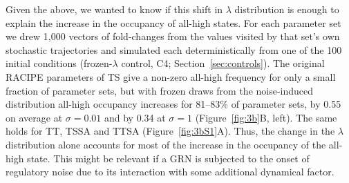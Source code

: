 \documentclass[11pt]{article}
\providecommand{\DIFaddtex}[1]{{\protect\color{red}#1}} %
\providecommand{\DIFdeltex}[1]{} %
\providecommand{\DIFaddbegin}{} %
\providecommand{\DIFaddend}{} %
\providecommand{\DIFdelbegin}{} %
\providecommand{\DIFdelend}{} %
\providecommand{\DIFadd}[1]{\texorpdfstring{\DIFaddtex{#1}}{#1}} %
\providecommand{\DIFdel}[1]{\texorpdfstring{\DIFdeltex{#1}}{}} %
\providecommand{\DIFaddincludegraphics}[2][]{\DIFOincludegraphics[#1]{#2}} %
\providecommand{\DIFdelincludegraphics}[2][]{}
\DeclareRobustCommand{\DIFaddbegin}{\DIFOaddbegin \let\includegraphics\DIFaddincludegraphics} %
\DeclareRobustCommand{\DIFaddend}{\DIFOaddend \let\includegraphics\DIFOincludegraphics} %
\DeclareRobustCommand{\DIFdelbegin}{\DIFOdelbegin \let\includegraphics\DIFdelincludegraphics} %
\DeclareRobustCommand{\DIFdelend}{\DIFOaddend \let\includegraphics\DIFOincludegraphics} %
\begin{document}
Given the above, we wanted to know if this shift in $\lambda$ distribution is enough to \DIFdelbegin \DIFdel{completely }\DIFdelend explain the increase in the \DIFdelbegin \DIFdel{MRT }\DIFdelend \DIFaddbegin \DIFadd{occupancy }\DIFaddend of all-high states. For each parameter set \DIFdelbegin \DIFdel{used for stochastic simulations, we sampled $\lambda$ from the additive noise stationary distribution shown in (Figure~\ref{fig:3b}A). For each such $\lambda$ combination, we simulated the networks deterministically }\DIFdelend \DIFaddbegin \DIFadd{we drew 1}{\DIFadd{,}}\DIFadd{000 vectors of fold-changes from the values visited by that set's own stochastic trajectories and simulated each deterministically from one of the 100 initial conditions }\DIFaddend (\DIFdelbegin \DIFdel{$\sigma = 0$) at multiple randomly sampled initial conditions and calculate the mean frequency of each discrete state across initial conditions , which is further averaged over different }\DIFdelend \DIFaddbegin \DIFadd{frozen-}\DIFaddend $\lambda$ \DIFdelbegin \DIFdel{values. While the }\DIFdelend \DIFaddbegin \DIFadd{control, C4; Section~\ref{sec:controls}). The }\DIFaddend original RACIPE parameters \DIFdelbegin \DIFdel{for TS and TT have a very }\DIFdelend \DIFaddbegin \DIFadd{of TS give a non-zero all-high frequency for only a }\DIFaddend small fraction of parameter sets\DIFdelbegin \DIFdel{with non-zero frequency of }\DIFdelend \DIFaddbegin \DIFadd{, but with frozen draws from the noise-induced distribution }\DIFaddend all-high \DIFdelbegin \DIFdel{states, the majority of resampled simulations led to a non-zero frequency of all-high states, reaching up to 0.9 in TS and up to 0.75 in TT }\DIFdelend \DIFaddbegin \DIFadd{occupancy increases for 81--83\% of parameter sets, by 0.55 on average at $\sigma = 0.01$ and by 0.34 at $\sigma = 1$ }\DIFaddend (Figure~\ref{fig:3b}B, \DIFdelbegin \DIFdel{\ref{fig:3bS1}A). For }\DIFdelend \DIFaddbegin \DIFadd{left). The same holds for TT, }\DIFaddend TSSA and TTSA \DIFdelbegin \DIFdel{, which inherently stabilize the all-high states due to the self-activation links, resampled simulations still led to an increase in the frequency of all-high states for a majority of the parameter sets }\DIFdelend (Figure~\DIFdelbegin \DIFdel{\ref{fig:3b}B, }\DIFdelend \ref{fig:3bS1}A). Thus, the change in the $\lambda$ distribution \DIFdelbegin \DIFdel{does significantly contribute to increasing the MRT of }\DIFdelend \DIFaddbegin \DIFadd{alone accounts for most of the increase in the occupancy of the }\DIFaddend all-high state. This might be relevant if a GRN is subjected to the onset of regulatory noise due to its interaction with some additional dynamical factor\DIFaddbegin \DIFadd{.
}\DIFaddend 
\end{document}
